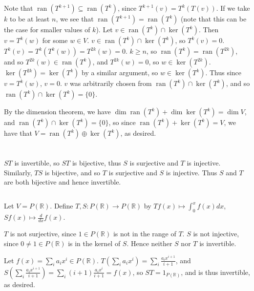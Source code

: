 \documentclass[11pt]{article}
\DeclareMathOperator{\ran}{ran}
\begin{document}
Note that $\ran(T^{k+1})\subseteq\ran(T^k)$, since $T^{k+1}(v)=T^k(T(v))$. If
we take $k$ to be at least $n$, we see that $\ran(T^{k+1})=\ran(T^k)$ (note
that this can be the case for smaller values of $k$). Let
$v\in\ran(T^k)\cap\ker(T^k)$. Then $v=T^k(w)$ for some $w\in V$.
$v\in\ran(T^k)\cap\ker(T^k)$, so $T^k(v)=0$. $T^k(v)=T^k(T^k(w))=T^{2k}(w)=0$.
$k\ge n$, so $\ran(T^k)=\ran(T^{2k})$, and so $T^{2k}(w)\in\ran(T^k)$, and
$T^{2k}(w)=0$, so $w\in\ker(T^{2k})$. $\ker(T^{2k})=\ker(T^k)$ by a similar
argument, so $w\in\ker(T^k)$. Thus since $v=T^k(w)$, $v=0$. $v$ was
arbitrarily chosen from $\ran(T^k)\cap\ker(T^k)$, and so
$\ran(T^k)\cap\ker(T^k)=\{0\}$.

By the dimension theorem, we have $\dim\ran(T^k)+\dim\ker(T^k)=\dim V$, and
$\ran(T^k)\cap\ker(T^k)=\{0\}$, so since $\ran(T^k)+\ker(T^k)=V$, we have that
$V=\ran(T^k)\oplus\ker(T^k)$, as desired.


\section{} %
\subsection{} %
$ST$ is invertible, so $ST$ is bijective, thus $S$ is surjective and $T$ is
injective. Similarly, $TS$ is bijective, and so $T$ is surjective and $S$ is
injective. Thus $S$ and $T$ are both bijective and hence invertible.


\subsection{} %
Let $V=P(\mathbb{R})$. Define $T,S:P(\mathbb{R})\longrightarrow P(\mathbb{R})$
by $Tf(x)\longmapsto\int_0^xf(x)dx$, $Sf(x)\longmapsto\frac{d}{dx}f(x)$.

$T$ is not surjective, since $1\in P(\mathbb{R})$ is not in the range of $T$.
$S$ is not injective, since $0\neq1\in P(\mathbb{R})$ is in the kernel of $S$.
Hence neither $S$ nor $T$ is invertible.

Let $f(x)=\sum_ia_ix^i\in P(\mathbb{R})$.
$T(\sum_ia_ix^i)=\sum_i\frac{a_ix^{i+1}}{i+1}$, and
$S(\sum_i\frac{a_ix^{i+1}}{i+1})=\sum_i(i+1)\frac{a_ix^i}{i+1}=f(x)$, so
$ST=1_{P(\mathbb{R})}$, and is thus invertible, as desired.
\end{document}
